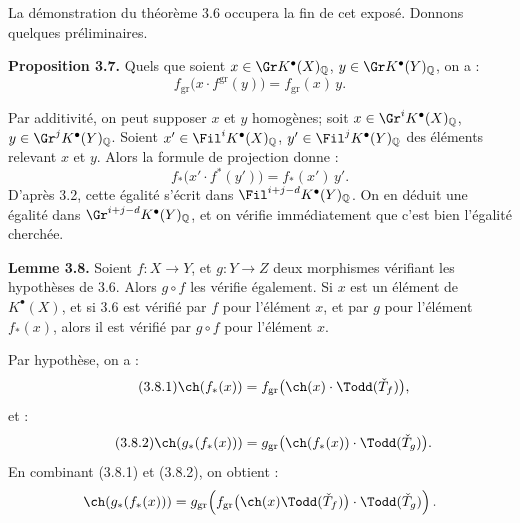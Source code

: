 La démonstration du
théorème 3.6 occupera la fin de cet exposé. Donnons quelques préliminaires.

\textbf{Proposition 3.7.} Quels que soient $x\in \Gr K^{\bullet}(X)_{\mathbb Q}$, $y\in \Gr K^{\bullet}(Y)_{\mathbb Q}$, on a :
\[
 f_{\mathrm{gr}}\bigl(x\cdot f^{\mathrm{gr}}(y)\bigr)
 =
 f_{\mathrm{gr}}(x)\,y .
\]

Par additivité, on peut supposer \(x\) et \(y\) homogènes; soit $x\in \Gr^iK^{\bullet}(X)_{\mathbb Q}$, $y\in \Gr^jK^{\bullet}(Y)_{\mathbb Q}$.
Soient $x'\in \Fil^iK^{\bullet}(X)_{\mathbb Q}$, $y'\in \Fil^jK^{\bullet}(Y)_{\mathbb Q}$ des éléments relevant \(x\) et \(y\). Alors la formule de projection donne :
\[
 f_*\bigl(x'\cdot f^*(y')\bigr)=f_*(x')\,y'.
\]
D'après 3.2, cette égalité s'écrit dans
\(\Fil^{i+j-d}K^{\bullet}(Y)_{\mathbb Q}\). On en déduit une égalité dans
\(\Gr^{i+j-d}K^{\bullet}(Y)_{\mathbb Q}\), et on vérifie immédiatement que c'est bien l'égalité cherchée.

\textbf{Lemme 3.8.} Soient \(f:X\to Y\), et \(g:Y\to Z\) deux morphismes vérifiant les hypothèses de 3.6. Alors \(g\circ f\) les vérifie également. Si \(x\) est un élément de \(K^{\bullet}(X)\), et si 3.6 est vérifié par \(f\) pour l'élément \(x\), et par \(g\) pour l'élément \(f_*(x)\), alors il est vérifié par \(g\circ f\) pour l'élément \(x\).

Par hypothèse, on a :
\begin{equation}\tag{3.8.1}
 \ch(f_*(x))=
 f_{\mathrm{gr}}\bigl(\ch(x)\cdot\Todd(\check T_f)\bigr),
\end{equation}
et :
\begin{equation}\tag{3.8.2}
 \ch(g_*(f_*(x)))=
 g_{\mathrm{gr}}\bigl(\ch(f_*(x))\cdot\Todd(\check T_g)\bigr).
\end{equation}
En combinant (3.8.1) et (3.8.2), on obtient :
\[
\ch(g_*(f_*(x)))=
g_{\mathrm{gr}}\!\left(
 f_{\mathrm{gr}}\bigl(\ch(x)\Todd(\check T_f)\bigr)\cdot \Todd(\check T_g)
\right).
\]
